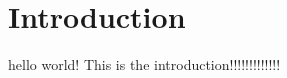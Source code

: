 \section{Introduction}
\setlength{\parindent}{10ex}
hello world! This is the introduction!!!!!!!!!!!!!